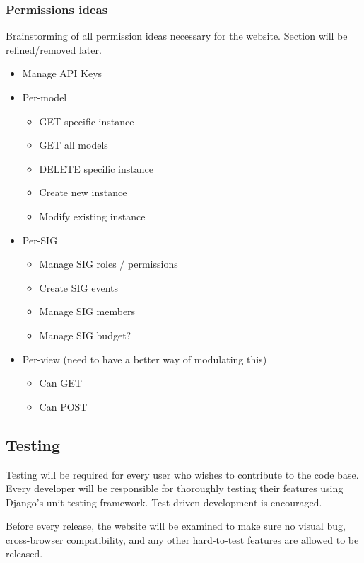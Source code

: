\documentclass{article}
\begin{document}
\subsubsection{Permissions ideas}
Brainstorming of all permission ideas necessary for the website. Section will be
refined/removed later.
\begin{itemize}
    \item Manage API Keys
    \item Per-model
    \begin{itemize}
        \item GET specific instance
        \item GET all models
        \item DELETE specific instance
        \item Create new instance
        \item Modify existing instance
    \end{itemize}

    \item Per-SIG
    \begin{itemize}
        \item Manage SIG roles / permissions
        \item Create SIG events
        \item Manage SIG members
        \item Manage SIG budget?
    \end{itemize}

    \item Per-view (need to have a better way of modulating this)
    \begin{itemize}
        \item Can GET
        \item Can POST
    \end{itemize}


\end{itemize}
\subsection{Testing}
Testing will be required for every user who wishes to contribute to the code base.
Every developer will be responsible for thoroughly testing their features using Django's
unit-testing framework. Test-driven development is encouraged. 

Before every release, the website will be examined to make sure no visual bug,
cross-browser compatibility, and any other hard-to-test features are allowed
to be released. 
\end{document}
